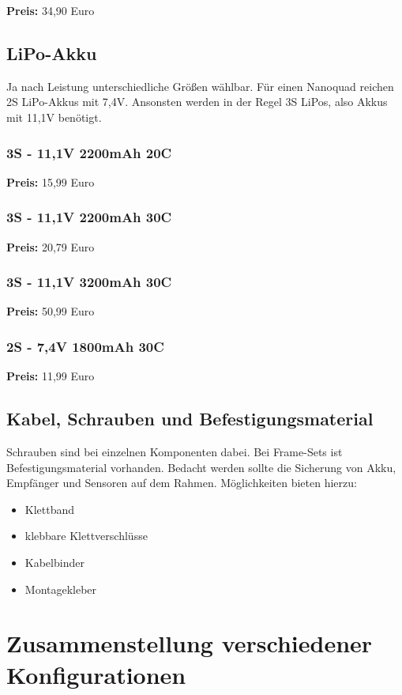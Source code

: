 \documentclass[12pt,a4paper]{article}
\begin{document}
\textbf{Preis:} 34,90 Euro

\subsection*{LiPo-Akku}
Ja nach Leistung unterschiedliche Größen wählbar. Für einen Nanoquad reichen 2S LiPo-Akkus mit 7,4V. Ansonsten werden in der Regel 3S LiPos, also Akkus mit 11,1V benötigt.

\subsubsection*{3S - 11,1V 2200mAh 20C}
\textbf{Preis:} 15,99 Euro

\subsubsection*{3S - 11,1V 2200mAh 30C}
\textbf{Preis:} 20,79 Euro

\subsubsection*{3S - 11,1V 3200mAh 30C}
\textbf{Preis:} 50,99 Euro

\subsubsection*{2S - 7,4V 1800mAh 30C}
\textbf{Preis:} 11,99 Euro

\subsection*{Kabel, Schrauben und Befestigungsmaterial}
Schrauben sind bei einzelnen Komponenten dabei. Bei Frame-Sets ist Befestigungsmaterial vorhanden. Bedacht werden sollte die Sicherung von Akku, Empfänger und Sensoren auf dem Rahmen. Möglichkeiten bieten hierzu:
\begin{itemize}
	\item Klettband
	\item klebbare Klettverschlüsse
	\item Kabelbinder
	\item Montagekleber
\end{itemize} 

\section*{Zusammenstellung verschiedener Konfigurationen}
\end{document}

